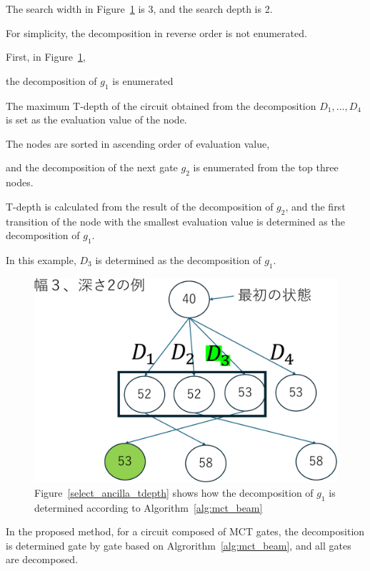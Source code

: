 The search width in Figure~\ref{mct_beam} is 3, and the search depth is 2.

For simplicity, the decomposition in reverse order is not enumerated.

First, in Figure~\ref{mct_beam},

the decomposition of $g_{1}$ is enumerated 

The maximum T-depth of the circuit obtained from the decomposition $D_{1},\dots,D_{4}$ is set as the evaluation value of the node.

The nodes are sorted in ascending order of evaluation value,

and the decomposition of the next gate $g_{2}$ is enumerated from the top three nodes.

T-depth is calculated from the result of the decomposition of $g_{2}$,
and the first transition of the node with the smallest evaluation value is determined as the decomposition of $g_{1}$.

In this example, $D_{3}$ is determined as the decomposition of $g_{1}$.

\begin{figure}[tbp]

\centering

\includegraphics[width=0.95\linewidth]{img/mct_beam.pdf}

\caption{Figure~\ref{select_ancilla_tdepth} shows how the decomposition of $g_{1}$ is determined according to Algorithm~\ref{alg:mct_beam}}

\label{mct_beam}

\end{figure}

In the proposed method, for a circuit composed of MCT gates, the decomposition is determined gate by gate
based on Algrorithm~\ref{alg:mct_beam}, and all gates are decomposed.

